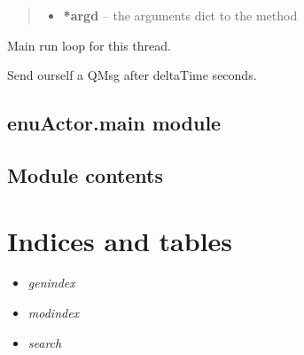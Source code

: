 \documentclass[letterpaper,10pt,english]{sphinxmanual}
\begin{document}
\begin{fulllineitems}
\begin{fulllineitems}
\begin{quote}
\begin{description}
\begin{itemize}
\item {} 
\textbf{*argd} -- the arguments dict to the method

\end{itemize}

\end{description}\end{quote}

\end{fulllineitems}


\begin{fulllineitems}
\label{enuActor:enuActor.QThread.QThread.run}
Main run loop for this thread.

\end{fulllineitems}


\begin{fulllineitems}
\label{enuActor:enuActor.QThread.QThread.sendLater}
Send ourself a QMsg after deltaTime seconds.

\end{fulllineitems}


\end{fulllineitems}



\section{enuActor.main module}
\label{enuActor:enuactor-main-module}

\section{Module contents}
\label{enuActor:module-enuActor}\label{enuActor:module-contents}

\chapter{Indices and tables}
\label{index:indices-and-tables}\begin{itemize}
\item {} 
\emph{genindex}

\item {} 
\emph{modindex}

\item {} 
\emph{search}

\end{itemize}
\end{document}
